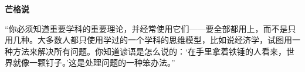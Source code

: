 \renewcommand{\bookchapter}{书单3}
\cleardoublepage
{}

\textbf{芒格说}
\par

\begin{MungerSaysBox}
{\kaishu “你必须知道重要学科的重要理论，并经常使用它们——要全部都用上，而不是只用几种。大多数人都只使用学过的一个学科的思维模型，比如说经济学，试图用一种方法来解决所有问题。你知道谚语是怎么说的：‘在手里拿着铁锤的人看来，世界就像一颗钉子。’这是处理问题的一种笨办法。”}
\par
\end{MungerSaysBox}

\cleardoublepage








